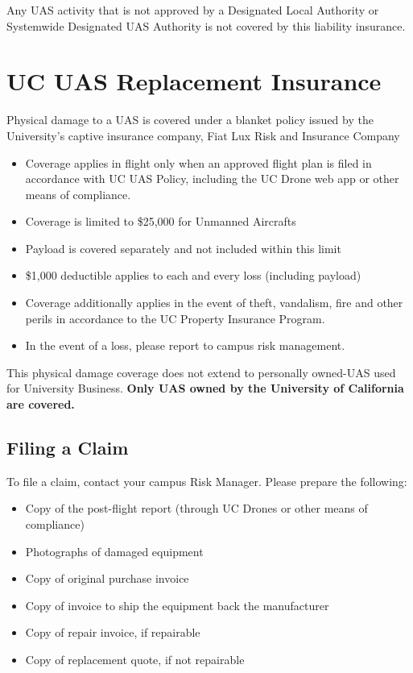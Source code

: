 \documentclass[
  12pt,
]{book}
\providecommand{\tightlist}{%
  \setlength{\itemsep}{0pt}\setlength{\parskip}{0pt}}
\begin{document}
Any UAS activity that is not approved by a Designated Local Authority or Systemwide Designated UAS Authority is not covered by this liability insurance.

\hypertarget{hull-insurance}{%
\section{UC UAS Replacement Insurance}\label{hull-insurance}}

Physical damage to a UAS is covered under a blanket policy issued by the University's captive insurance company, Fiat Lux Risk and Insurance Company

\begin{itemize}
\tightlist
\item
  Coverage applies in flight only when an approved flight plan is filed in accordance with UC UAS Policy, including the UC Drone web app or other means of compliance.\\
\item
  Coverage is limited to \$25,000 for Unmanned Aircrafts
\item
  Payload is covered separately and not included within this limit
\item
  \$1,000 deductible applies to each and every loss (including payload)
\item
  Coverage additionally applies in the event of theft, vandalism, fire and other perils in accordance to the UC Property Insurance Program.
\item
  In the event of a loss, please report to campus risk management.
\end{itemize}

This physical damage coverage does not extend to personally owned-UAS used for University Business. \textbf{Only UAS owned by the University of California are covered.}

\hypertarget{filing-a-claim}{%
\subsection{Filing a Claim}\label{filing-a-claim}}

To file a claim, contact your campus Risk Manager. Please prepare the following:

\begin{itemize}
\tightlist
\item
  Copy of the post-flight report (through UC Drones or other means of compliance)
\item
  Photographs of damaged equipment
\item
  Copy of original purchase invoice
\item
  Copy of invoice to ship the equipment back the manufacturer
\item
  Copy of repair invoice, if repairable
\item
  Copy of replacement quote, if not repairable
\end{itemize}
\end{document}
